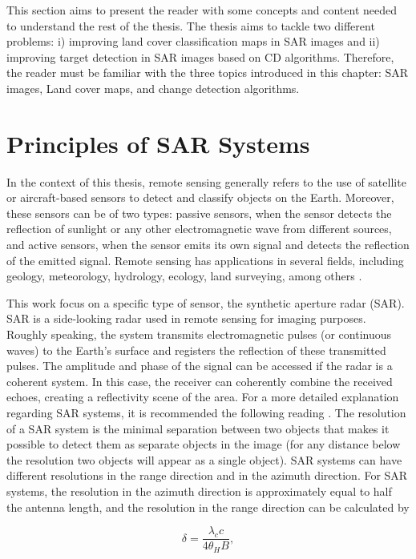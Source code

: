 This section aims to present the reader with some concepts and content needed to understand the rest of the thesis. The thesis aims to tackle two different problems: i) improving land cover classification maps in SAR images and ii) improving target detection in SAR images based on CD algorithms. Therefore, the reader must be familiar with the three topics introduced in this chapter: SAR images, Land cover maps, and change detection algorithms.

\section{Principles of SAR Systems}
In the context of this thesis, remote sensing generally refers to the use of satellite or aircraft-based sensors to detect and classify objects on the Earth. Moreover, these sensors can be of two types: passive sensors, when the sensor detects the reflection of sunlight or any other electromagnetic wave from different sources, and active sensors, when the sensor emits its own signal and detects the reflection of the emitted signal. Remote sensing has applications in several fields, including geology, meteorology, hydrology, ecology, land surveying, among others \cite{survey-rs}.

This work focus on a specific type of sensor, the synthetic aperture radar (SAR). SAR is a side-looking radar used in remote sensing for imaging purposes. Roughly speaking, the system transmits electromagnetic pulses (or continuous waves) to the Earth's surface and registers the reflection of these transmitted pulses. The amplitude and phase of the signal can be accessed if the radar is a coherent system. In this case, the receiver can coherently combine the received echoes, creating a reflectivity scene of the area. For a more detailed explanation regarding SAR systems, it is recommended the following reading \cite{Alberto, livro}. The resolution of a SAR system is the minimal separation between two objects that
makes it possible to detect them as separate objects in the image (for any distance below
the resolution two objects will appear as a single object). SAR systems can have different
resolutions in the range direction and in the azimuth direction. For SAR systems, the resolution in the azimuth direction is approximately equal to half the antenna length, and the resolution in the range direction can be calculated by

\begin{equation}
    \delta = \frac{\lambda_c c}{4 \theta_H B},
\end{equation}

